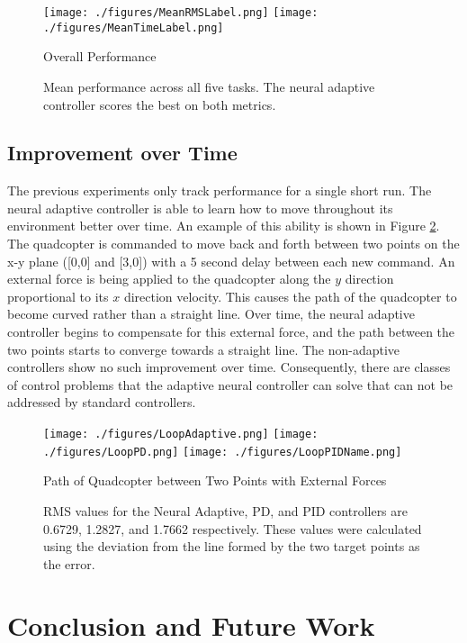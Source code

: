 \documentclass[letterpaper, 10 pt, conference]{ieeeconf}  %
\begin{document}
\begin{figure}
\centering
\texttt{[image: ./figures/MeanRMSLabel.png]}
\texttt{[image: ./figures/MeanTimeLabel.png]}
\caption{Overall Performance}
\label{fig:OverallPerformance}
\captionsetup{singlelinecheck=off,font=footnotesize}
\caption*{Mean performance across all five tasks. The neural adaptive controller scores the best on both metrics.}
\end{figure}


\subsection{Improvement over Time}

The previous experiments only track performance for a single short run. 
The neural adaptive controller is able to learn how to move throughout its environment better over time.
An example of this ability is shown in Figure \ref{fig:loop_path}.
The quadcopter is commanded to move back and forth between two points on the x-y plane ([0,0] and [3,0]) with a 5 second delay between each new command.
An external force is being applied to the quadcopter along the $y$ direction proportional to its $x$ direction velocity.
This causes the path of the quadcopter to become curved rather than a straight line.
Over time, the neural adaptive controller begins to compensate for this external force, and the path between the two points starts to converge towards a straight line.
The non-adaptive controllers show no such improvement over time.
Consequently, there are classes of control problems that the adaptive neural controller can solve that can not be addressed by standard controllers.

\begin{figure}
\centering
\texttt{[image: ./figures/LoopAdaptive.png]}
\texttt{[image: ./figures/LoopPD.png]}
\texttt{[image: ./figures/LoopPIDName.png]}
\caption{Path of Quadcopter between Two Points with External Forces}
\label{fig:loop_path}
\captionsetup{singlelinecheck=off,font=footnotesize}
\caption*{
RMS values for the Neural Adaptive, PD, and PID controllers are 0.6729, 1.2827, and 1.7662 respectively. These values were calculated using the deviation from the line formed by the two target points as the error.}
\end{figure}

\section{Conclusion and Future Work}
\end{document}
